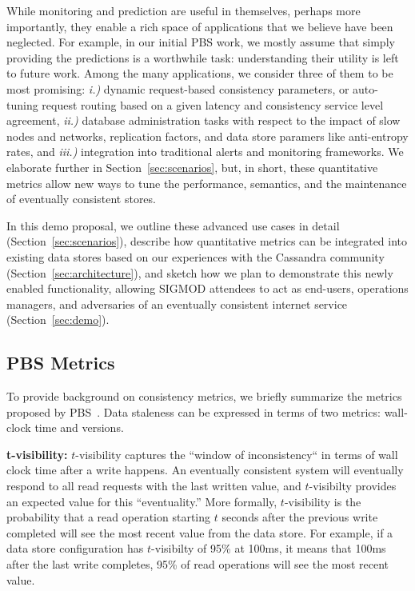While monitoring and prediction are useful in themselves, perhaps more
importantly, they enable a rich space of applications that we believe
have been neglected. For example, in our initial PBS work, we mostly
assume that simply providing the predictions is a worthwhile task:
understanding their utility is left to future work. Among the many 
applications, we consider three of them to be most promising: \textit{i.)} dynamic
request-based consistency parameters, or auto-tuning request routing
based on a given latency and consistency service level agreement,
\textit{ii.)} database administration tasks with respect to the impact
of slow nodes and networks, replication factors, and data store
paramers like anti-entropy rates, and \textit{iii.)} integration into
traditional alerts and monitoring frameworks. We elaborate further in
Section~\ref{sec:scenarios}, but, in short, these quantitative metrics
allow new ways to tune the performance, semantics, and the maintenance
of eventually consistent stores.

In this demo proposal, we outline these advanced use cases in detail
(Section~\ref{sec:scenarios}), describe how quantitative metrics
can be integrated into existing data stores based on our
experiences with the Cassandra community
(Section~\ref{sec:architecture}), and sketch how we plan to
demonstrate this newly enabled functionality, allowing SIGMOD
attendees to act as end-users, operations managers, and
adversaries of an eventually consistent internet service
(Section~\ref{sec:demo}).

\subsection{PBS Metrics}
To provide background on consistency metrics, we briefly summarize the
metrics proposed by PBS~\cite{pbs-vldb2012}. Data
staleness can be expressed in terms of two metrics: wall-clock time
and versions.

\textbf{t-visibility:} $t$-visibility captures the ``window of
inconsistency`` in terms of wall clock time after a write happens. An
eventually consistent system will eventually respond to all read
requests with the last written value, and $t$-visibilty provides an expected
value for this ``eventuality.''  More formally, $t$-visibility is the
probability that a read operation starting $t$ seconds after the
previous write completed will see the most recent value from the data
store. For example, if a data store configuration has $t$-visibilty of
95\% at 100ms, it means that 100ms after the last write completes,
95\% of read operations will see the most recent value.

